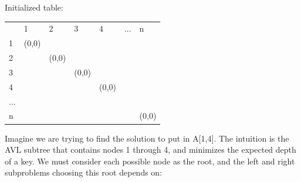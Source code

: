 \documentclass[a4paper]{article}
\begin{document}
Initialized table:
\begin{table}[htb]
\centering
\begin{tabular}{lllllll}
                       & 1                          & 2                          & 3                          & 4                          & ...                   & n                          \\ \cline{2-5} \cline{7-7} 
\multicolumn{1}{l|}{1} & \multicolumn{1}{l|}{(0,0)} & \multicolumn{1}{l|}{}      & \multicolumn{1}{l|}{}      & \multicolumn{1}{l|}{}      & \multicolumn{1}{l|}{} & \multicolumn{1}{l|}{}      \\ \cline{2-5} \cline{7-7} 
2                      & \multicolumn{1}{l|}{}      & \multicolumn{1}{l|}{(0,0)} & \multicolumn{1}{l|}{}      & \multicolumn{1}{l|}{}      & \multicolumn{1}{l|}{} & \multicolumn{1}{l|}{}      \\ \cline{3-5} \cline{7-7} 
3                      &                            & \multicolumn{1}{l|}{}      & \multicolumn{1}{l|}{(0,0)} & \multicolumn{1}{l|}{}      & \multicolumn{1}{l|}{} & \multicolumn{1}{l|}{}      \\ \cline{4-5} \cline{7-7} 
4                      &                            &                            & \multicolumn{1}{l|}{}      & \multicolumn{1}{l|}{(0,0)} & \multicolumn{1}{l|}{} & \multicolumn{1}{l|}{}      \\ \cline{5-5} \cline{7-7} 
...                    &                            &                            &                            &                            &                       &                            \\ \cline{7-7} 
n                      &                            &                            &                            &                            & \multicolumn{1}{l|}{} & \multicolumn{1}{l|}{(0,0)} \\ \cline{7-7} 
\end{tabular}
\end{table}


Imagine we are trying to find the solution to put in A[1,4]. The intuition is the AVL subtree that contains nodes 1 through 4, and minimizes the expected depth of a key. We must consider each possible node as the root, and the left and right subproblems choosing this root depends on:
\end{document}
